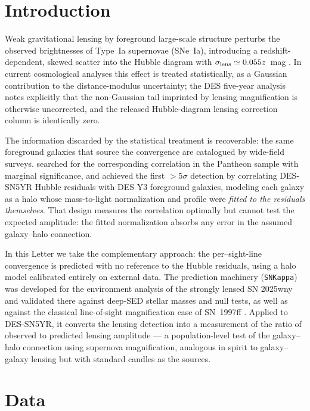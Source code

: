 \documentclass[twocolumn]{aastex701}
\newcommand{\snk}{\texttt{SNKappa}}
\begin{document}
\section{Introduction}\label{sec:intro}

Weak gravitational lensing by foreground large-scale structure perturbs
the observed brightnesses of Type~Ia supernovae (SNe~Ia), introducing a
redshift-dependent, skewed scatter into the Hubble diagram with
$\sigma_{\rm lens} \simeq 0.055z$~mag \citep{Holz2005,Jonsson2010}. In
current cosmological analyses this effect is treated statistically, as a
Gaussian contribution to the distance-modulus uncertainty; the DES
five-year analysis \citep[DES-SN5YR;][]{Abbott2024} notes explicitly that
the non-Gaussian tail imprinted by lensing magnification is otherwise
uncorrected, and the released Hubble-diagram lensing correction column is
identically zero.

The information discarded by the statistical treatment is recoverable:
the same foreground galaxies that source the convergence are catalogued
by wide-field surveys. \citet{Shah2022} searched for the corresponding
correlation in the Pantheon sample with marginal significance, and
\citet{Shah2024} achieved the first $>5\sigma$ detection by correlating
DES-SN5YR Hubble residuals with DES Y3 foreground galaxies, modeling
each galaxy as a halo whose mass-to-light normalization and profile were
\emph{fitted to the residuals themselves}. That design measures the
correlation optimally but cannot test the expected amplitude: the fitted
normalization absorbs any error in the assumed galaxy--halo connection.

In this Letter we take the complementary approach: the per--sight-line
convergence is predicted with no reference to the Hubble residuals, using
a halo model calibrated entirely on external data. The prediction machinery
(\snk) was developed for the environment analysis of the strongly lensed
SN 2025wny \citep[][M\"ortsell et al. 2026, in preparation]{Goobar2026}
and validated there against deep-SED stellar masses and null tests, as
well as against the classical line-of-sight magnification case of
SN~1997ff \citep{Benitez2002}. Applied to DES-SN5YR, it converts the
lensing detection into a measurement of the ratio of observed to predicted
lensing amplitude --- a population-level test of the galaxy--halo
connection using supernova magnification, analogous in spirit to
galaxy--galaxy lensing but with standard candles as the sources.

\section{Data}\label{sec:data}
\end{document}
